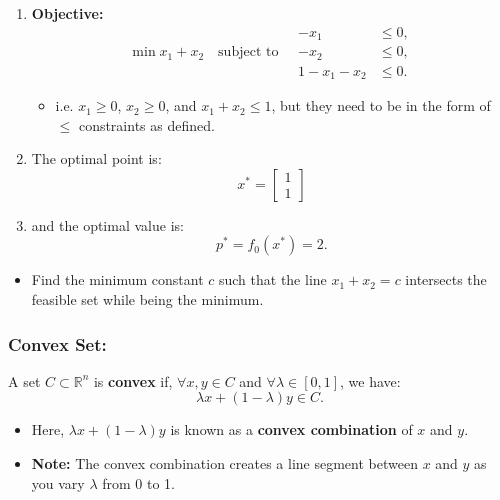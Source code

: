 \begin{example}
    \begin{enumerate}
        \item \textbf{Objective:}  
        \[
        \min x_1 + x_2 \quad \text{subject to} \quad
        \begin{aligned}
            -x_1 &\leq 0, \\
            -x_2 &\leq 0, \\
            1 - x_1 - x_2 &\leq 0.
        \end{aligned}
        \]
        \begin{itemize}
            \item i.e. $x_1 \geq 0$, $x_2 \geq 0$, and $x_1 + x_2 \leq 1$, but they need to be in the form of $\leq$ constraints as defined. 
        \end{itemize}
        
        \item The optimal point is:
        \[
        x^* = \begin{bmatrix} 1 \\ 1 \end{bmatrix}
        \]
        
        \item and the optimal value is:
        \[
        p^* = f_0(x^*) = 2.
        \]
    \end{enumerate}
    \begin{itemize}
        \item Find the minimum constant $c$ such that the line $x_1 + x_2 = c$ intersects the feasible set while being the minimum. 
    \end{itemize}
\end{example}

\subsubsection{Convex Set:}
\begin{definition}
    A set $C \subset \mathbb{R}^n$ is \textbf{convex} if, $\forall x, y \in C$ and $\forall \lambda \in [0, 1]$, we have:
    \[
    \lambda x + (1 - \lambda)y \in C.
    \]

    \begin{itemize}
        \item Here, $\lambda x + (1 - \lambda)y$ is known as a \textbf{convex combination} of $x$ and $y$.
        \item \textbf{Note:} The convex combination creates a line segment between $x$ and $y$ as you vary $\lambda$ from 0 to 1.
    \end{itemize}
\end{definition}


